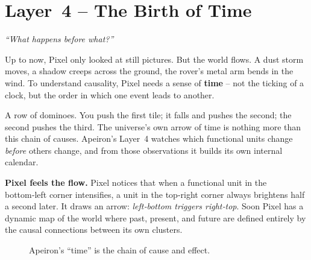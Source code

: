 \section{Layer~4 – The Birth of Time}
\label{sec:layer4}

\begin{tcolorbox}[colback=blue!5, colframe=blue!60, title=\textbf{Superpower: The Time Weaver}]
\begin{center}
\textit{“What happens before what?”}
\end{center}
\end{tcolorbox}

Up to now, Pixel only looked at still pictures.  But the world flows.
A dust storm moves, a shadow creeps across the ground, the rover’s
metal arm bends in the wind.  To understand causality, Pixel needs a
sense of \textbf{time} – not the ticking of a clock, but the order in
which one event leads to another.

\begin{tcolorbox}[colback=yellow!5, colframe=yellow!80, title=Real‑life analogy]
A row of dominoes.  You push the first tile; it falls and pushes the
second; the second pushes the third.  The universe’s own arrow of time
is nothing more than this chain of causes.  Apeiron’s Layer~4 watches
which functional units change \emph{before} others change, and from
those observations it builds its own internal calendar.
\end{tcolorbox}

\textbf{Pixel feels the flow.}
Pixel notices that when a functional unit in the bottom‑left corner
intensifies, a unit in the top‑right corner always brightens half a
second later.  It draws an arrow: \emph{left‑bottom triggers
right‑top}.  Soon Pixel has a dynamic map of the world where past,
present, and future are defined entirely by the causal connections
between its own clusters.

\begin{figure}[ht]
\centering
{}
\caption{Apeiron’s “time” is the chain of cause and effect.}
\label{fig:time}
\end{figure}

